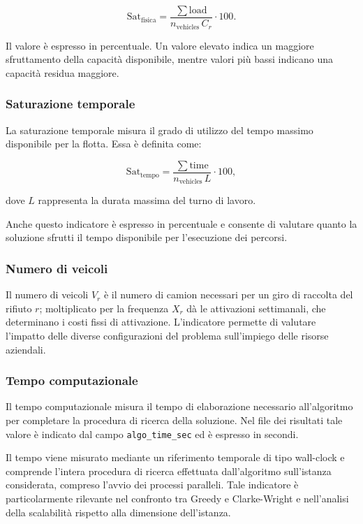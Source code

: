 \[
\mathrm{Sat}_{\mathrm{fisica}}
=
\frac{\sum \mathrm{load}}
{n_{\mathrm{vehicles}}\,C_r}
\cdot 100.
\]

Il valore è espresso in percentuale. Un valore elevato indica un maggiore sfruttamento della capacità disponibile, mentre valori più bassi indicano una capacità residua maggiore.

\subsubsection{Saturazione temporale}

La saturazione temporale misura il grado di utilizzo del tempo massimo disponibile per la flotta. Essa è definita come:

\[
\mathrm{Sat}_{\mathrm{tempo}}
=
\frac{\sum \mathrm{time}}
{n_{\mathrm{vehicles}}\,L}
\cdot 100,
\]

dove $L$ rappresenta la durata massima del turno di lavoro.

Anche questo indicatore è espresso in percentuale e consente di valutare quanto la soluzione sfrutti il tempo disponibile per l'esecuzione dei percorsi.

\subsubsection{Numero di veicoli}

Il numero di veicoli $V_r$ è il numero di camion necessari per un giro di raccolta del rifiuto $r$; moltiplicato per la frequenza $X_r$ dà le attivazioni settimanali, che determinano i costi fissi di attivazione. L'indicatore permette di valutare l'impatto delle diverse configurazioni del problema sull'impiego delle risorse aziendali.

\subsubsection{Tempo computazionale}

Il tempo computazionale misura il tempo di elaborazione necessario all'algoritmo per completare la procedura di ricerca della soluzione. Nel file dei risultati tale valore è indicato dal campo \texttt{algo\_time\_sec} ed è espresso in secondi.

Il tempo viene misurato mediante un riferimento temporale di tipo wall-clock e comprende l'intera procedura di ricerca effettuata dall'algoritmo sull'istanza considerata, compreso l'avvio dei processi paralleli. Tale indicatore è particolarmente rilevante nel confronto tra Greedy e Clarke-Wright e nell'analisi della scalabilità rispetto alla dimensione dell'istanza.

